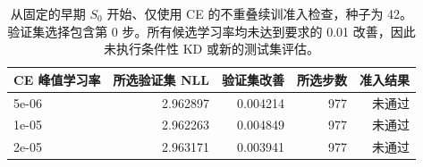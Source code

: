 \begin{table}[!t]
\centering
\begin{tabular}{lrrrr}
\toprule
CE 峰值学习率 & 所选验证集 NLL & 验证集改善 & 所选步数 & 准入结果 \\
\midrule
5e-06 & 2.962897 & 0.004214 & 977 & 未通过 \\
1e-05 & 2.962263 & 0.004849 & 977 & 未通过 \\
2e-05 & 2.963171 & 0.003941 & 977 & 未通过 \\
\bottomrule
\end{tabular}
\caption{从固定的早期 $S_0$ 开始、仅使用 CE 的不重叠续训准入检查，种子为 42。验证集选择包含第 0 步。所有候选学习率均未达到要求的 0.01 改善，因此未执行条件性 KD 或新的测试集评估。}
\label{tab:modern_ce_gate}
\end{table}
